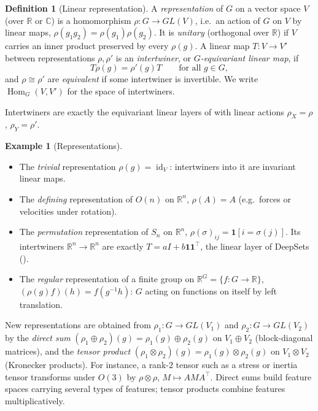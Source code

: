 \documentclass[11pt]{article}
\theoremstyle{plain}
\theoremstyle{definition}
\newtheorem{Definition}{Definition}[section]
\newtheorem{Example}{Example}[section]
\begin{document}
\begin{Definition}[Linear representation]\label{def:linear-representation}
A \emph{representation} of $G$ on a vector space $V$ (over $\mathbb{R}$ or $\mathbb{C}$) is a homomorphism $\rho : G\to GL(V)$, i.e.\ an action of $G$ on $V$ by linear maps, $\rho(g_1g_2) = \rho(g_1)\rho(g_2)$.
It is \emph{unitary} (orthogonal over $\mathbb{R}$) if $V$ carries an inner product preserved by every $\rho(g)$.
A linear map $T : V\to V'$ between representations $\rho,\rho'$ is an \emph{intertwiner}, or \emph{$G$-equivariant linear map}, if
\[
    T\rho(g) = \rho'(g)T \qquad\text{for all } g\in G,
\]
and $\rho\cong\rho'$ are \emph{equivalent} if some intertwiner is invertible.
We write $\operatorname{Hom}_G(V,V')$ for the space of intertwiners.
\end{Definition}

Intertwiners are exactly the equivariant linear layers of  with linear actions $\rho_X = \rho$, $\rho_Y = \rho'$.

\begin{Example}[Representations]\label{ex:representations-recap}
\phantom{u}
\begin{itemize}
    \item The \emph{trivial} representation $\rho(g) = \operatorname{id}_V$: intertwiners into it are invariant linear maps.
    \item The \emph{defining} representation of $O(n)$ on $\mathbb{R}^n$, $\rho(A)=A$ (e.g.\ forces or velocities under rotation).
    \item The \emph{permutation} representation of $S_n$ on $\mathbb{R}^n$, $\rho(\sigma)_{ij} = \mathbf{1}[i = \sigma(j)]$. Its intertwiners $\mathbb{R}^n\to\mathbb{R}^n$ are exactly $T = aI + b\mathbf{1}\mathbf{1}^\top$, the linear layer of DeepSets ().
    \item The \emph{regular} representation of a finite group on $\mathbb{R}^{G} = \{f : G\to\mathbb{R}\}$, $(\rho(g)f)(h) = f(g^{-1}h)$: $G$ acting on functions on itself by left translation.
\end{itemize}
\end{Example}

New representations are obtained from $\rho_1: G\to GL(V_1)$ and $\rho_2 : G\to GL(V_2)$ by the \emph{direct sum} $(\rho_1\oplus\rho_2)(g) = \rho_1(g)\oplus\rho_2(g)$ on $V_1\oplus V_2$ (block-diagonal matrices), and the \emph{tensor product} $(\rho_1\otimes\rho_2)(g) = \rho_1(g)\otimes\rho_2(g)$ on $V_1\otimes V_2$ (Kronecker products).
For instance, a rank-$2$ tensor such as a stress or inertia tensor transforms under $O(3)$ by $\rho\otimes\rho$, $M\mapsto AMA^\top$.
Direct sums build feature spaces carrying several types of features; tensor products combine features multiplicatively.
\end{document}
